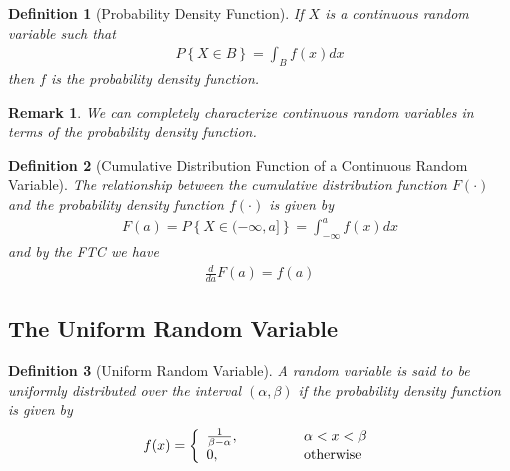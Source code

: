 \documentclass[11pt, oneside]{book}   	%
\newtheorem{definition}{Definition}[chapter]
\newtheorem{remark}{Remark}[chapter]
\begin{document}
\begin{spacing}{1.618}
\begin{definition}[Probability Density Function]
	If $X$ is a continuous random variable such that 
	\begin{alignat}{4}
		P\left\{X\in B\right\}=\int_Bf(x)dx
	\end{alignat}
	then $f$ is the probability density function. 
\end{definition}

\begin{remark}
	We can completely characterize continuous random variables in terms of the probability density function.
\end{remark}

\begin{definition}[Cumulative Distribution Function of a Continuous Random Variable]
	The relationship between the cumulative distribution function $F(\cdot)$ and the probability density function $f(\cdot)$ is given by 
	\begin{alignat}{4}
		F(a)=P\left\{X\in (-\infty, a]\right\} = \int_{-\infty}^af(x)dx
	\end{alignat}
	and by the FTC we have
	\begin{alignat}{4}
		\frac{d}{da}F(a)=f(a)
	\end{alignat}
\end{definition}

\subsection{The Uniform Random Variable}

\begin{definition}[Uniform Random Variable]
	A random variable is said to be uniformly distributed over the interval $(\alpha, \beta)$ if the probability density function is given by 
	\begin{alignat}{4}
		f(x)=\left\{\begin{array}{lll}
			\frac{1}{\beta - \alpha},&\hspace{1 cm}&\alpha < x < \beta \\
			0,&\hspace{1 cm}&\textrm{otherwise}
		\end{array}\right.
	\end{alignat}
\end{definition}


\end{spacing}
\end{document}
